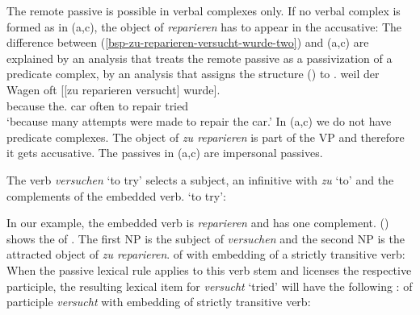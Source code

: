\noindent
The remote passive is possible in verbal complexes only. If no verbal complex is formed as in
(a,c), the object of \emph{reparieren} has to appear in the accusative:
\eal
{}
\zl
The difference between (\ref{bsp-zu-reparieren-versucht-wurde-two}) and (a,c) are explained by an analysis that treats the remote passive as a passivization
of a predicate complex, \ie by an analysis that assigns the structure () to .
\ea
\gll weil    der        Wagen oft   [[zu reparieren versucht] wurde].\\
     because the.\NOM{} car   often \hphantom{[[}to repair   tried     \AUX\\
\glt `because many attempts were made to repair the car.'\label{bsp-zu-reparieren-versucht-wurde-three}
%
\z
In (a,c) we do not have predicate complexes. The object of \emph{zu reparieren} is part of the VP
and therefore it gets accusative. The passives in (a,c) are impersonal passives.


The verb \emph{versuchen} `to try' selects a subject, an infinitive with \emph{zu} `to' and the
complements of the embedded verb.
\ea
{} `to try':\\
\z

In our example, the embedded verb is \emph{reparieren} and has one complement. () shows the
\argstv of . The first NP is the subject of \emph{versuchen} and the second NP is the
attracted object of \emph{zu reparieren}.
\ea
\argstv of  with embedding of a strictly transitive verb:\\
\z
When the passive lexical rule applies to this verb stem and licenses the respective participle, the
resulting lexical item for \emph{versucht} `tried' will have the following \argstv:
\ea
\argst of participle \emph{versucht} with embedding of strictly transitive verb:\\
\z

